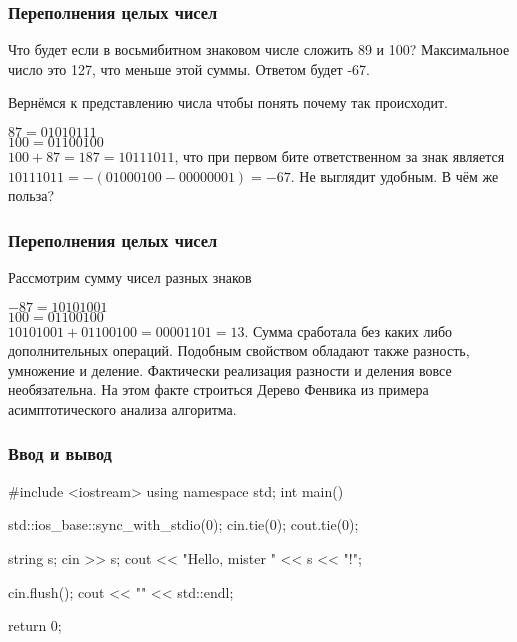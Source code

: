 
\begin{frame}
    \frametitle{Переполнения целых чисел}

    \quad Что будет если в восьмибитном знаковом числе сложить 89 и 100? Максимальное число это 127, что меньше этой суммы. Ответом будет -67.

    \quad Вернёмся к представлению числа чтобы понять почему так происходит.

    \quad $87 = 01010111$\\
    \quad $100 = 01100100$\\
    \quad $100 + 87 = 187 = 10111011$, что при первом бите ответственном за знак является $10111011 = -(01000100 - 00000001) = -67$. Не выглядит удобным. В чём же польза?

\end{frame}


\begin{frame}
    \frametitle{Переполнения целых чисел}

    \quad Рассмотрим сумму чисел разных знаков

    \quad $-87 = 10101001$\\
    \quad $100 = 01100100$\\
    \quad $10101001 + 01100100 = 00001101 = 13$. Сумма сработала без каких либо дополнительных операций. Подобным свойством обладают также разность, умножение и деление. Фактически реализация разности и деления вовсе необязательна. На этом факте строиться Дерево Фенвика из примера асимптотического анализа алгоритма.

\end{frame}


\begin{frame}[fragile]
    \frametitle{Ввод и вывод}

    \begin{cpp}
        #include <iostream>
        using namespace std;
        int main(){
            std::ios_base::sync_with_stdio(0);
            cin.tie(0);
            cout.tie(0);

            string s;
            cin >> s;
            cout << "Hello, mister " << s << "!";

            cin.flush();
            cout << "\n" << std::endl;
            
            return 0;
        }
    \end{cpp}
\end{frame}

